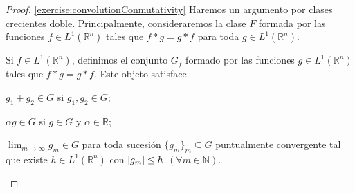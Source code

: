 \documentclass{article}
\newcommand{\naturalNumbers}{\mathbb{N}}
\newcommand{\realNumbers}{\mathbb{R}}
\newcommand{\integrableFunctions}{L^1(\realNumbers^n)}
\theoremstyle{remark}
\begin{document}
  \begin{proof}
    \ref{exercise:convolutionConmutativity}
    Haremos un argumento por clases crecientes doble.
    Principalmente, consideraremos la clase \(F\) formada por las funciones \(f \in L^1(\realNumbers^n)\) tales que \(f * g = g * f\) para toda \(g \in L^1(\realNumbers^n)\).

    Si \(f \in L^1(\realNumbers^n)\), definimos el conjunto \(G_f\) formado por las funciones \(g \in L^1(\realNumbers^n)\) tales que \(f * g = g * f\). Este objeto satisface
    \begin{enumerate*}
      \item \(g_1 + g_2 \in G\) si \(g_1, g_2 \in G\);
      \item \(\alpha g \in G\) si \(g \in G\) y \(\alpha \in \realNumbers\);
      \item \(\lim_{m \rightarrow \infty} g_m \in G\) para toda sucesión \(\{g_m\}_m \subseteq G\) puntualmente convergente tal que existe \(h \in \integrableFunctions\) con \(\abs{g_m} \leq h\) \((\forall m \in \naturalNumbers)\).
    \end{enumerate*}


\end{proof}
\end{document}
